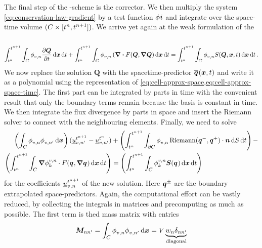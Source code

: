 The final step of the \aderdg{}-scheme is the corrector.
We then multiply the system \cref{eq:conservation-law-gradient} by a test function $\stestfunction{i}$ and integrate over the space-time volume $(C_{} \times [t^n, t^{n+1}])$.
We arrive yet again at the weak formulation of the \pde\
\begin{equation}
  \label{eq:weak-pde}
\intdt{\intdcell{
\stestfunction[][v,n] \pdv{\Q}{t}
}}
+
\intdt{\intdcell{
    \stestfunction[][v,n] \left( \div{F(\Q, \gradQ } \right)
}}
=
\intdt{\intdcell{
    \stestfunction[][v,n] S(\Q, \bm{x}, t)
}}.
\end{equation}
We now replace the solution $\bm{Q}$ with the spacetime-predictor $\stpredictor (\bm{x},t)$ and write it as a polynomial using the representation of \cref{eq:cell-approx-space,eq:cell-approx-space-time}.
The first part can be integrated by parts in time with the convenient result that only the boundary terms remain because the basis is constant in time.
We then integrate the flux divergence by parts in space and insert the Riemann solver to connect with the neighbouring elements.
Finally, we need to solve
\newcommand{\massMatrixDef}{\intdcell{
  \stestfunction[][v,n] \sbasis[][v,n']
}}
\begin{align}
\begin{split}
\label{eq:corrector}
\left(
\massMatrixDef
\right)
(\ssolCoeff[t^{n+1}][v,n'] - \ssolCoeff[t^n][v,n'])
&+
\left(\intdt{\intdcellb{
      \stestfunction[][v,n] \Riemann(\spredictor[-], \spredictor[+]) \cdot \normal
}}\right)
-\\
\left(\intdt{\intdcell{
    \gradient{\stestfunction[v,n][k]} \cdot  \flux(\spredictor, \gradient{\spredictor}) %
}}\right)
&=
\left(\intdt{\intdcell{
      \stestfunction[v,n][k] \source(\spredictor)
}}\right)
\end{split}
\end{align}
for the coefficients $\ssolCoeff[\nextTime][v,n]$ of the new solution.
Here $\spredictor[\pm]$ are the boundary extrapolated space-predictors.
Again, the computational effort can be vastly reduced, by collecting the integrals in matrices and precomputing as much as possible.
The first term is thed mass matrix with entries
\newcommand{\massMatrix}[1][]{\bm{M}_{#1}}
\begin{equation}
  \label{eq:mass-matrix}
  \massMatrix[n n'] = \massMatrixDef = \volume \underbrace{\quadWeight[n] \delta_{n n'}}_{\text{diagonal}}
\end{equation}
